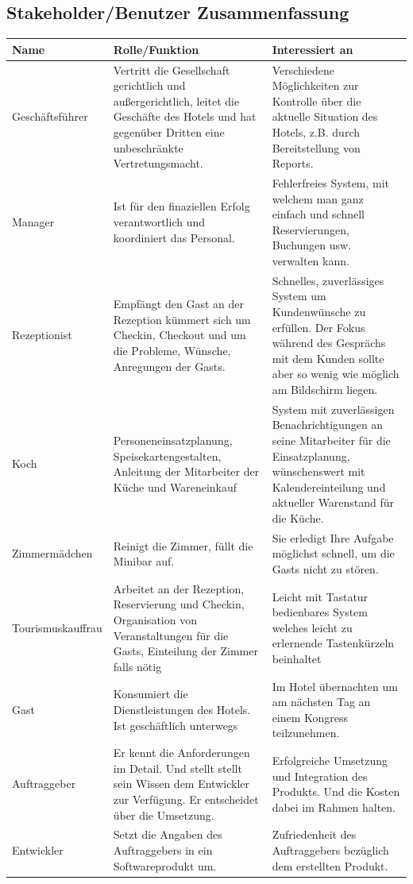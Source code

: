 \documentclass[10pt,a4paper,titlepage]{article}
\begin{document}
\subsection{Stakeholder\slash{}Benutzer Zusammenfassung}
\begin{tabular}{|l|p{4cm}|p{4cm}|}
    \hline
    \textbf{Name} & \textbf{Rolle\slash{}Funktion} & \textbf{Interessiert an} \\
    \hline
    Geschäftsführer & 
Vertritt die Gesellschaft gerichtlich und außergerichtlich, leitet die Geschäfte des Hotels und hat gegenüber Dritten eine unbeschränkte Vertretungsmacht. &
    Verschiedene Möglichkeiten zur Kontrolle über die aktuelle Situation des Hotels, z.B. durch Bereitstellung von Reports.\\
    \hline
    Manager &
	Ist für den finaziellen Erfolg verantwortlich und koordiniert das Personal. &
	Fehlerfreies System, mit welchem man ganz einfach und schnell Reservierungen, Buchungen usw. verwalten kann. \\
    \hline
    \Gls{Rezeptionist} &
	Empfängt den \Gls{Gast} an der \Gls{Rezeption} kümmert sich um \Gls{Checkin}, \Gls{Checkout} und um die Probleme, Wünsche, Anregungen der \Glspl{Gast}. &
	Schnelles, zuverlässiges System um Kundenwünsche zu erfüllen. Der Fokus während des Gesprächs mit dem \Gls{Kunde}n sollte aber so wenig wie möglich am Bildschirm liegen. \\
    \hline
    Koch &
Personeneinsatzplanung, Speisekartengestalten, Anleitung der \Gls{Mitarbeiter} der Küche und Wareneinkauf &
	System mit zuverlässigen Benachrichtigungen an seine \Gls{Mitarbeiter} für die Einsatzplanung, wünschenswert mit Kalendereinteilung und aktueller Warenstand für die Küche. \\
    \hline
    Zimmermädchen & 
	Reinigt die Zimmer, füllt die Minibar auf. &
	Sie erledigt Ihre Aufgabe möglichst schnell, um die \Glspl{Gast} nicht zu stören. \\
    \hline
    Tourismuskauffrau &
	Arbeitet an der \Gls{Rezeption}, \Gls{Reservierung} und \Gls{Checkin}, Organisation von Veranstaltungen für die \Glspl{Gast}, Einteilung der \Gls{Zimmer} falls nötig &
	Leicht mit Tastatur bedienbares System welches leicht zu erlernende Tastenkürzeln beinhaltet \\
    \hline
    \Gls{Gast} &
	Konsumiert die Dienstleistungen des Hotels. Ist geschäftlich unterwegs &
	Im Hotel übernachten um am nächsten Tag an einem Kongress teilzunehmen. \\
    \hline
    Auftraggeber &
	Er kennt die Anforderungen im Detail. Und stellt stellt sein Wissen dem Entwickler zur Verfügung. Er entscheidet über die Umsetzung. &
	Erfolgreiche Umsetzung und Integration des Produkts. Und die Kosten dabei im Rahmen halten. \\
    \hline
    Entwickler &
	Setzt die Angaben des Auftraggebers in ein Softwareprodukt um. &
	Zufriedenheit des Auftraggebers bezüglich dem erstellten Produkt.\\
    \hline
\end{tabular}
\end{document}
